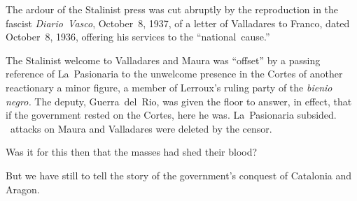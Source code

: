 The ardour of the Stalinist press was cut abruptly by the reproduction in the fascist \emph{Diario~Vasco}, October~8, 1937, of a letter of Va\-lla\-da\-res to Franco, dated October~8, 1936, offering his services to the ``national~cause.''

The Stalinist welcome to Valladares and Maura was ``offset'' by a passing reference of La~Pasionaria to the unwelcome presence in the Cortes of another reactionary a minor figure, a member of Lerroux’s ruling party of the \emph{bienio negro.} The deputy, Guerra~del~Rio, was given the floor to answer, in effect, that if the government rested on the Cortes, here he was. La~Pasionaria subsided. \CNT\ attacks on Maura and Valladares were deleted by the censor.

\medskip
Was it for this then that the masses had shed their blood?
\medskip

But we have still to tell the story of the government’s conquest of Catalonia and Aragon.